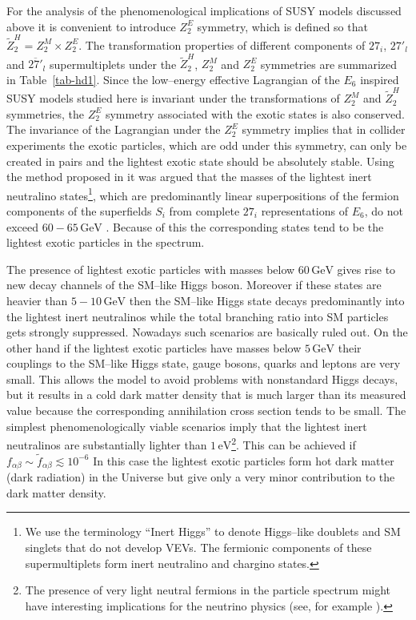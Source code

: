 \documentclass[12pt,a4paper]{article}
\begin{document}
For the analysis of the phenomenological implications of SUSY models discussed
above it is convenient to introduce $Z_{2}^{E}$ symmetry, which is defined so that
$\tilde{Z}^{H}_2 = Z_{2}^{M}\times Z_{2}^{E}$. The transformation properties
of different components of $27_i$, $27'_l$ and $\overline{27'}_l$ supermultiplets under
the $\tilde{Z}^{H}_2$, $Z_{2}^{M}$ and $Z_{2}^{E}$ symmetries are summarized
in Table~\ref{tab-hd1}. Since the low--energy effective Lagrangian of the $E_6$ inspired
SUSY models studied here is invariant under the transformations of $Z_{2}^{M}$ and
$\tilde{Z}^{H}_2$ symmetries, the $Z_{2}^{E}$ symmetry associated with the exotic
states is also conserved. The invariance of the Lagrangian under the $Z_{2}^{E}$ symmetry
implies that in collider experiments the exotic particles, which are odd under this symmetry,
can only be created in pairs and the lightest exotic state should be absolutely stable.
Using the method proposed in \cite{Hesselbach:2007te} it was argued that the masses
of the lightest inert neutralino states\footnote{We use the terminology ``Inert Higgs'' to
denote Higgs--like doublets and SM singlets that do not develop VEVs. The fermionic components
of these supermultiplets form inert neutralino and chargino states.}, which are predominantly linear
superpositions of the fermion components of the superfields $S_i$ from complete $27_i$
representations of $E_6$, do not exceed $60-65\,\mbox{GeV}$ \cite{Hall:2010ix}.
Because of this the corresponding states tend to be the lightest exotic particles in the spectrum.

The presence of lightest exotic particles with masses below $60\,\mbox{GeV}$ gives rise to
new decay channels of the SM--like Higgs boson. Moreover if these states are heavier
than $5-10\,\mbox{GeV}$ then the SM--like Higgs state decays predominantly into the
lightest inert neutralinos while the total branching ratio into SM particles gets strongly suppressed.
Nowadays such scenarios are basically ruled out. On the other hand if the lightest exotic particles
have masses below $5\,\mbox{GeV}$ their couplings to the SM--like Higgs state, gauge bosons,
quarks and leptons are very small. This allows the model to avoid problems with
 nonstandard Higgs decays, but it results in a cold dark matter density that
is much larger than its measured value
because the corresponding annihilation cross section tends to be small.
The simplest phenomenologically viable scenarios imply that the lightest inert neutralinos
are substantially lighter than $1\,\mbox{eV}$\footnote{The presence of very light neutral fermions
in the particle spectrum might have interesting implications for the neutrino physics (see, for
example \cite{Frere:1996gb}).}. This can be achieved if $f_{\alpha\beta}\sim \tilde{f}_{\alpha\beta}\lesssim 10^{-6}$
In this case the lightest exotic particles form hot dark matter (dark radiation) in the Universe
but give only a very minor contribution to the dark matter density.
\end{document}
